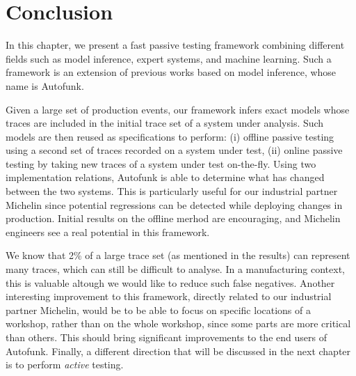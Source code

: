 \section{Conclusion}
\label{sec:testing:conclusion}

In this chapter, we present a fast passive testing framework
combining different fields such as model inference, expert
systems, and machine learning. Such a framework is an extension
of previous works based on model inference, whose name is
Autofunk.

Given a large set of production events, our framework infers
exact models whose traces are included in the initial trace set
of a system under analysis. Such models are then reused as
specifications to perform: (i) offline passive testing using a
second set of traces recorded on a system under test, (ii) online
passive testing by taking new traces of a system under test
on-the-fly.
Using two implementation relations, Autofunk is able to determine
what has changed between the two systems. This is particularly
useful for our industrial partner Michelin since potential
regressions can be detected while deploying changes in
production. Initial results on the offline merhod are
encouraging, and Michelin engineers see a real potential in this
framework.

We know that 2\% of a large trace set (as mentioned in the
results) can represent many traces, which can still be difficult
to analyse. In a manufacturing context, this is valuable altough
we would like to reduce such false negatives.
Another interesting improvement to this framework, directly
related to our industrial partner Michelin, would be to be able
to focus on specific locations of a workshop, rather than on the
whole workshop, since some parts are more critical than others.
This should bring significant improvements to the end users of
Autofunk. Finally, a different direction that will be discussed
in the next chapter is to perform \textit{active} testing.
